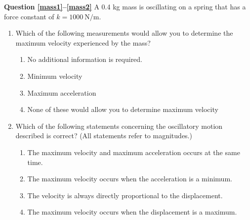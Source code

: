\documentclass[11pt]{article}
\begin{document}
\begin{multicols}{2}
  \textbf{Question \ref{mass1}--\ref{mass2}} A 0.4 kg mass is oscillating on a
  spring that has a force constant of $k=\SI{1000}{\newton\per\metre}$.
  \begin{enumerate}[leftmargin=18pt,resume]
  \item Which of the following measurements would allow you to determine the
    maximum velocity experienced by the mass?
    \label{mass1}
    \begin{enumerate}[noitemsep,topsep=0pt,leftmargin=18pt,label=(\Alph*)]
    \item No additional information is required.
    \item Minimum velocity
    \item Maximum acceleration
    \item None of these would allow you to determine maximum velocity
    \end{enumerate}
    \columnbreak
    
  \item Which of the following statements concerning the oscillatory motion
    described is correct? (All statements refer to magnitudes.)
    \label{mass2}
    \begin{enumerate}[noitemsep,topsep=0pt,leftmargin=18pt,label=(\Alph*)]
    \item The maximum velocity and maximum acceleration occurs at the same time.
    \item The maximum velocity occurs when the acceleration is a minimum.
    \item The velocity is always directly proportional to the displacement.
    \item The maximum velocity occurs when the displacement is a maximum.
    \end{enumerate}
  \end{enumerate}
\end{multicols}
\end{document}
